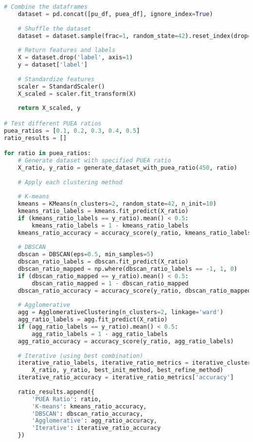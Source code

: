 \begin{lstlisting}[language=Python, caption=PUEA Percentage Experiment Implementation]
    # Combine the dataframes
    dataset = pd.concat([pu_df, puea_df], ignore_index=True)
    
    # Shuffle the dataset
    dataset = dataset.sample(frac=1, random_state=42).reset_index(drop=True)
    
    # Return features and labels
    X = dataset.drop('label', axis=1)
    y = dataset['label']
    
    # Standardize features
    scaler = StandardScaler()
    X_scaled = scaler.fit_transform(X)
    
    return X_scaled, y

# Test different PUEA ratios
puea_ratios = [0.1, 0.2, 0.3, 0.4, 0.5]
ratio_results = []

for ratio in puea_ratios:
    # Generate dataset with specified PUEA ratio
    X_ratio, y_ratio = generate_dataset_with_puea_ratio(450, ratio)
    
    # Apply each clustering method
    
    # K-means
    kmeans = KMeans(n_clusters=2, random_state=42, n_init=10)
    kmeans_ratio_labels = kmeans.fit_predict(X_ratio)
    if (kmeans_ratio_labels == y_ratio).mean() < 0.5:
        kmeans_ratio_labels = 1 - kmeans_ratio_labels
    kmeans_ratio_accuracy = accuracy_score(y_ratio, kmeans_ratio_labels)
    
    # DBSCAN
    dbscan = DBSCAN(eps=0.5, min_samples=5)
    dbscan_ratio_labels = dbscan.fit_predict(X_ratio)
    dbscan_ratio_mapped = np.where(dbscan_ratio_labels == -1, 1, 0)
    if (dbscan_ratio_mapped == y_ratio).mean() < 0.5:
        dbscan_ratio_mapped = 1 - dbscan_ratio_mapped
    dbscan_ratio_accuracy = accuracy_score(y_ratio, dbscan_ratio_mapped)
    
    # Agglomerative
    agg = AgglomerativeClustering(n_clusters=2, linkage='ward')
    agg_ratio_labels = agg.fit_predict(X_ratio)
    if (agg_ratio_labels == y_ratio).mean() < 0.5:
        agg_ratio_labels = 1 - agg_ratio_labels
    agg_ratio_accuracy = accuracy_score(y_ratio, agg_ratio_labels)
    
    # Iterative (using best combination)
    iterative_ratio_labels, iterative_ratio_metrics = iterative_clustering(
        X_ratio, y_ratio, best_init_method, best_refine_method)
    iterative_ratio_accuracy = iterative_ratio_metrics['accuracy']
    
    ratio_results.append({
        'PUEA Ratio': ratio,
        'K-means': kmeans_ratio_accuracy,
        'DBSCAN': dbscan_ratio_accuracy,
        'Agglomerative': agg_ratio_accuracy,
        'Iterative': iterative_ratio_accuracy
    })


\end{lstlisting}
